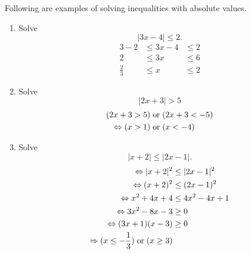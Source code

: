 \begin{example}
    Following are examples of solving inequalities with absolute values.
    \begin{enumerate}
        \item Solve \[|3x-4|\leq2.\]
        \begin{alignat*}{3}
            -2&\leq3x-4&\leq2\\
            2&\leq3x&\leq6\\
            \frac23&\leq x&\leq2
        \end{alignat*}
        
        \item Solve \[|2x+3|>5\]
        \begin{align*}
            (2x+3>5)&\;\text{or}\;(2x+3<-5)\\
            \Leftrightarrow (x>1)&\;\text{or}\;(x<-4)
        \end{align*}
        
        \item Solve \[|x+2|\leq|2x-1|.\]
        \begin{align*}
            \Leftrightarrow |x+2|^2&\leq|2x-1|^2\\
            \Leftrightarrow (x+2)^2&\leq(2x-1)^2\\
            \Leftrightarrow x^2+4x+4&\leq4x^2-4x+1\\
            \Leftrightarrow 3x^2-8x-3&\geq0\\
            \Leftrightarrow (3x+1)(x-3)&\geq0\\
            \Rightarrow(x\leq-\frac13)\;\text{or}\;(x\geq3)
        \end{align*}
    \end{enumerate}
\end{example}
